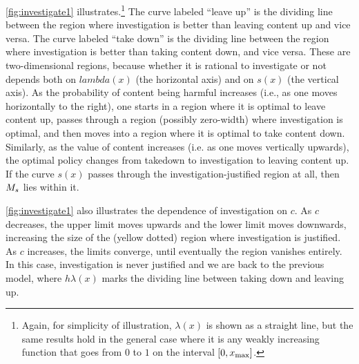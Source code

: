 \autoref{fig:investigate1} illustrates.\footnote{Again, for simplicity of illustration, $\lambda(x)$ is shown as a straight line, but the same results hold in the general case where it is any weakly increasing function that goes from $0$ to $1$ on the interval $[0,x_{\text{max}}]$.} The curve labeled ``leave up'' is the dividing line between the region where investigation is better than leaving content up and vice versa. The curve labeled ``take down'' is the dividing line between the region where investigation is better than taking content down, and vice versa. These are two-dimensional regions, because whether it is rational to investigate or not depends both on $lambda(x)$ (the horizontal axis) and on $s(x)$ (the vertical axis). As the probability of content being harmful increases (i.e., as one moves horizontally to the right), one starts in a region where it is optimal to leave content up, passes through a region (possibly zero-width) where investigation is optimal, and then moves into a region where it is optimal to take content down. Similarly, as the value of content increases (i.e. as one moves vertically upwards), the optimal policy changes from takedown to investigation to leaving content up. If the curve $s(x)$ passes through the investigation-justified region at all, then $M_s$ lies within it.

\autoref{fig:investigate1} also illustrates the dependence of investigation on $c$. As $c$ decreases, the upper limit moves upwards and the lower limit moves downwards, increasing the size of the (yellow dotted) region where investigation is justified. As $c$ increases, the limits converge, until eventually the region vanishes entirely. In this case, investigation is never justified and we are back to the previous model, where $h\lambda(x)$ marks the dividing line between taking down and leaving up.


